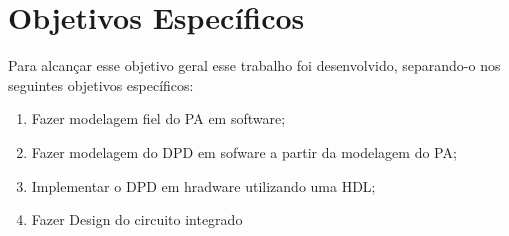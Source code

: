 \section{Objetivos Específicos}
Para alcançar esse objetivo geral esse trabalho foi desenvolvido, separando-o nos seguintes objetivos específicos:

\begin{enumerate}
    \item Fazer modelagem fiel do PA em software;
    \item Fazer modelagem do DPD em sofware a partir da modelagem do PA;
    \item Implementar o DPD em hradware utilizando uma HDL;
    \item Fazer Design do circuito integrado
\end{enumerate}


